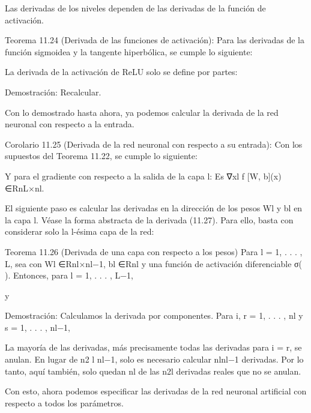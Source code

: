 \begin{frame}
  Las derivadas de los niveles dependen de las derivadas de la función de activación.

  Teorema 11.24 (Derivada de las funciones de activación): Para las derivadas de la función sigmoidea y la tangente hiperbólica, se cumple lo siguiente:

  La derivada de la activación de ReLU solo se define por partes:

  Demostración: Recalcular.

  Con lo demostrado hasta ahora, ya podemos calcular la derivada de la red neuronal con respecto a la entrada.

  Corolario 11.25 (Derivada de la red neuronal con respecto a su entrada): Con los supuestos del Teorema 11.22, se cumple lo siguiente:

  Y para el gradiente con respecto a la salida de la capa l:
  Es ∇xl f [W, b](x) ∈RnL×nl.

  El siguiente paso es calcular las derivadas en la dirección de los pesos Wl y bl en la capa l. Véase la forma abstracta de la derivada (11.27). Para ello, basta con considerar solo la l-ésima capa de la red:

  Teorema 11.26 (Derivada de una capa con respecto a los pesos) Para l = 1, . . . , L, sea
  con Wl ∈Rnl×nl−1, bl ∈Rnl y una función de activación diferenciable σ( ). Entonces,
  para l = 1, . . . , L−1,

  y

  Demostración: Calculamos la derivada por componentes. Para i, r = 1, . . . , nl y
  s = 1, . . . , nl−1,

  La mayoría de las derivadas, más precisamente todas las derivadas para i = r, se anulan. En lugar de
  n2
  l nl−1, solo es necesario calcular nlnl−1 derivadas. Por lo tanto,
  aquí también, solo quedan nl de las n2l derivadas reales que no se anulan.

  Con esto, ahora podemos especificar las derivadas de la red neuronal artificial con respecto a todos los parámetros.
\end{frame}

